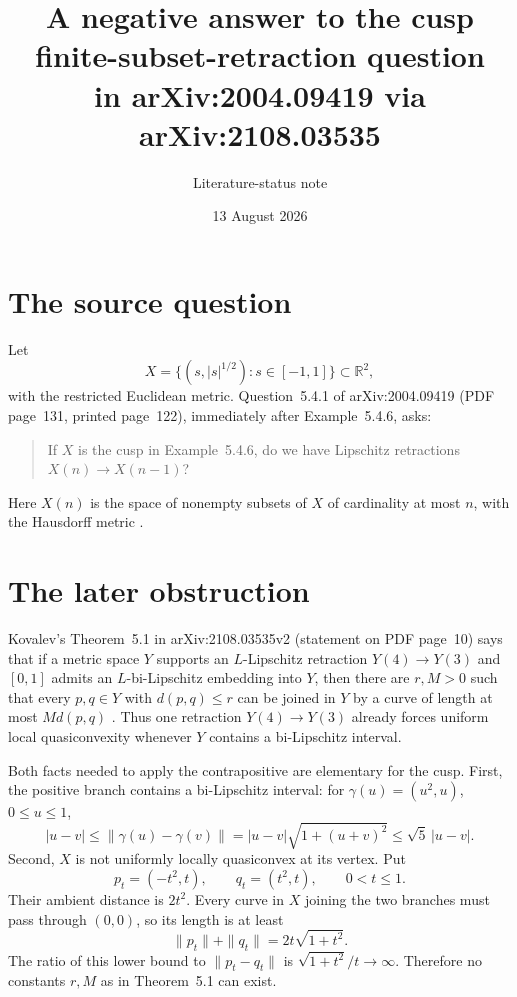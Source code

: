 \documentclass[11pt]{article}
\title{A negative answer to the cusp finite-subset-retraction question\\
in arXiv:2004.09419 via arXiv:2108.03535}
\author{Literature-status note}
\date{13 August 2026}
\newcommand{\R}{\mathbb R}
\begin{document}
\maketitle

\begin{center}
\end{center}

\section{The source question}

Let
\[
 X=\{(s,|s|^{1/2}):s\in[-1,1]\}\subset\R^2,
\]
with the restricted Euclidean metric.  Question~5.4.1 of
arXiv:2004.09419 (PDF page~131, printed page~122), immediately after
Example~5.4.6, asks:
\begin{quote}
If $X$ is the cusp in Example~5.4.6, do we have Lipschitz retractions
$X(n)\to X(n-1)$?
\end{quote}
Here $X(n)$ is the space of nonempty subsets of $X$ of cardinality at most
$n$, with the Hausdorff metric \cite{Ako20}.

\section{The later obstruction}

Kovalev's Theorem~5.1 in arXiv:2108.03535v2 (statement on PDF page~10)
says that if a metric space $Y$ supports an $L$-Lipschitz retraction
$Y(4)\to Y(3)$ and $[0,1]$ admits an $L$-bi-Lipschitz embedding into $Y$,
then there are $r,M>0$ such that every $p,q\in Y$ with $d(p,q)\le r$ can be
joined in $Y$ by a curve of length at most $M d(p,q)$ \cite{Kov21}.  Thus
one retraction $Y(4)\to Y(3)$ already forces uniform local quasiconvexity
whenever $Y$ contains a bi-Lipschitz interval.

Both facts needed to apply the contrapositive are elementary for the cusp.
First, the positive branch contains a bi-Lipschitz interval: for
\(\gamma(u)=(u^2,u)\), $0\le u\le1$,
\[
 |u-v|\le \|\gamma(u)-\gamma(v)\|
 =|u-v|\sqrt{1+(u+v)^2}\le\sqrt5\,|u-v|.
\]
Second, $X$ is not uniformly locally quasiconvex at its vertex.  Put
\[
 p_t=(-t^2,t),\qquad q_t=(t^2,t),\qquad 0<t\le1.
\]
Their ambient distance is $2t^2$.  Every curve in $X$ joining the two
branches must pass through $(0,0)$, so its length is at least
\[
 \|p_t\|+\|q_t\|=2t\sqrt{1+t^2}.
\]
The ratio of this lower bound to $\|p_t-q_t\|$ is
\(\sqrt{1+t^2}/t\to\infty\).  Therefore no constants $r,M$ as in
Theorem~5.1 can exist.
\end{document}
